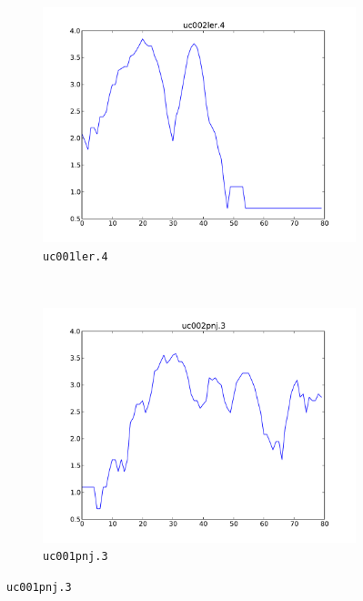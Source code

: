 \documentclass[parskip]{cs4rep}
\newcommand{\gene}[1]{{\tt #1}}
\begin{document}
\begin{figure}[t,b]
    \centering
    \begin{subfigure}[b]{0.3\textwidth}
        \centering
        \includegraphics[width=\textwidth]{figures/evaluation/exon_stretching/uc002ler_4.pdf}
        \caption{\gene{uc001ler.4}}
        \label{fig:evaluation:exon_stretching:seeds:a}
    \end{subfigure}
    ~
    \begin{subfigure}[b]{0.3\textwidth}
        \centering
        \includegraphics[width=\textwidth]{figures/evaluation/exon_stretching/uc002pnj_3.pdf}
        \caption{\gene{uc001pnj.3}}
        \label{fig:evaluation:exon_stretching:seeds:b}
    \end{subfigure}

\end{figure}
\end{document}
